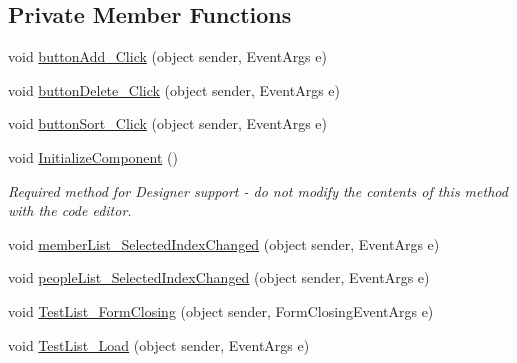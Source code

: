 \subsection*{Private Member Functions}
\begin{DoxyCompactItemize}
\item 
void \hyperlink{class__7___doroshenko__forms2__is52_1_1_test_list_a87ffd4c72f84d90e75d20bd62f0ee4f7}{button\+Add\+\_\+\+Click} (object sender, Event\+Args e)
\item 
void \hyperlink{class__7___doroshenko__forms2__is52_1_1_test_list_a161230ed32af2e62e141a8c6e8a4bedd}{button\+Delete\+\_\+\+Click} (object sender, Event\+Args e)
\item 
void \hyperlink{class__7___doroshenko__forms2__is52_1_1_test_list_a2ddc7d64b094c5e6d784633b310201f8}{button\+Sort\+\_\+\+Click} (object sender, Event\+Args e)
\item 
void \hyperlink{class__7___doroshenko__forms2__is52_1_1_test_list_acd9cb03990000f83a3e86ceac040ff7f}{Initialize\+Component} ()
\begin{DoxyCompactList}\small\item\em Required method for Designer support -\/ do not modify the contents of this method with the code editor. \end{DoxyCompactList}\item 
void \hyperlink{class__7___doroshenko__forms2__is52_1_1_test_list_afa5f16b3df276bde3cefe54969bf5bed}{member\+List\+\_\+\+Selected\+Index\+Changed} (object sender, Event\+Args e)
\item 
void \hyperlink{class__7___doroshenko__forms2__is52_1_1_test_list_a266dce962f1c7c8a005ab5548e21c56a}{people\+List\+\_\+\+Selected\+Index\+Changed} (object sender, Event\+Args e)
\item 
void \hyperlink{class__7___doroshenko__forms2__is52_1_1_test_list_a9b0f78bfb7c87b9208104bbe129ddd22}{Test\+List\+\_\+\+Form\+Closing} (object sender, Form\+Closing\+Event\+Args e)
\item 
void \hyperlink{class__7___doroshenko__forms2__is52_1_1_test_list_afcb94184c5a8e2b33b48961aee888668}{Test\+List\+\_\+\+Load} (object sender, Event\+Args e)
\end{DoxyCompactItemize}
